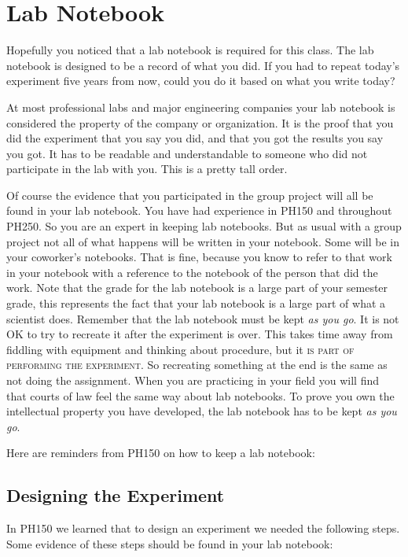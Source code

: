 \section{Lab Notebook}

Hopefully you noticed that a lab notebook is required for this class. The
lab notebook is designed to be a record of what you did. If you had to
repeat today's experiment five years from now, could you do it based on what
you write today?

At most professional labs and major engineering companies your lab notebook
is considered the property of the company or organization. It is the proof
that you did the experiment that you say you did, and that you got the
results you say you got. It has to be readable and understandable to someone
who did not participate in the lab with you. This is a pretty tall order.

Of course the evidence that you participated in the group project will all
be found in your lab notebook. You have had experience in PH150 and
throughout PH250. So you are an expert in keeping lab notebooks. But as
usual with a group project not all of what happens will be written in your
notebook. Some will be in your coworker's notebooks. That is fine, because
you know to refer to that work in your notebook with a reference to the
notebook of the person that did the work. Note that the grade for the lab
notebook is a {\Large large} part of your semester grade, this represents
the fact that your lab notebook is a {\Large large} part of what a scientist
does. Remember that the lab notebook must be kept \emph{as you go}. It is
not OK to try to recreate it after the experiment is over. This takes time
away from fiddling with equipment and thinking about procedure, but it 
\textsc{is part of performing the experiment.} So recreating something at
the end is the same as not doing the assignment. When you are practicing in
your field you will find that courts of law feel the same way about lab
notebooks. To prove you own the intellectual property you have developed,
the lab notebook has to be kept \emph{as you go}.

Here are reminders from PH150 on how to keep a lab notebook:

\subsection{Designing the Experiment}

In PH150 we learned that to design an experiment we needed the following
steps. Some evidence of these steps should be found in your lab notebook:

